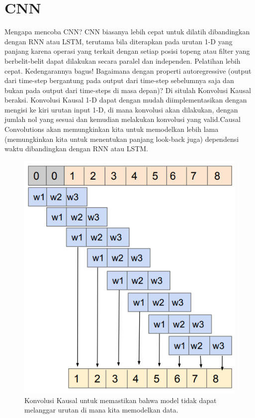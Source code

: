 \section{CNN}
Mengapa mencoba CNN? CNN biasanya lebih cepat untuk dilatih dibandingkan dengan RNN atau LSTM, terutama bila diterapkan pada urutan 1-D yang panjang karena operasi yang terkait dengan setiap posisi topeng atau filter yang berbelit-belit dapat dilakukan secara paralel dan independen. Pelatihan lebih cepat. Kedengarannya bagus! Bagaimana dengan properti autoregressive (output dari time-step bergantung pada output dari time-step sebelumnya saja dan bukan pada output dari time-steps di masa depan)? Di situlah Konvolusi Kausal beraksi. Konvolusi Kausal 1-D dapat dengan mudah diimplementasikan dengan mengisi ke kiri urutan input 1-D, di mana konvolusi akan dilakukan, dengan jumlah nol yang sesuai dan kemudian melakukan konvolusi yang valid.Causal Convolutions akan memungkinkan kita untuk memodelkan lebih lama (memungkinkan kita untuk menentukan panjang look-back juga) dependensi waktu dibandingkan dengan RNN atau LSTM.

\begin{figure}[H]
        \centerline{\includegraphics[scale=.5]{figures/cnn}}
        \caption{Konvolusi Kausal untuk memastikan bahwa model tidak dapat melanggar urutan di mana kita memodelkan data.}
		\label{cnn}
\end{figure}

